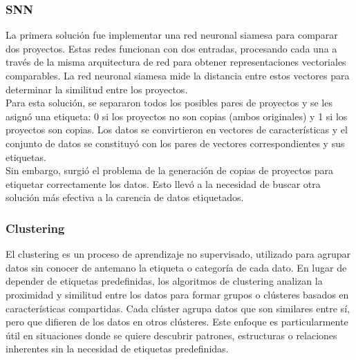 \subsubsection{SNN}
La primera solución fue implementar una red neuronal siamesa para comparar dos proyectos. Estas redes funcionan con dos entradas, procesando cada una a través de la misma arquitectura de red para obtener representaciones vectoriales comparables. La red neuronal siamesa mide la distancia entre estos vectores para determinar la similitud entre los proyectos.\\

Para esta solución, se separaron todos los posibles pares de proyectos y se les asignó una etiqueta: 0 si los proyectos no son copias (ambos originales) y 1 si los proyectos son copias. Los datos se convirtieron en vectores de características y el conjunto de datos se constituyó con los pares de vectores correspondientes y sus etiquetas.\\

Sin embargo, surgió el problema de la generación de copias de proyectos para etiquetar correctamente los datos. Esto llevó a la necesidad de buscar otra solución más efectiva a la carencia de datos etiquetados.


\subsubsection{Clustering}

El clustering es un proceso de aprendizaje no supervisado, utilizado para agrupar datos sin conocer de antemano la etiqueta o categoría de cada dato. En lugar de depender de etiquetas predefinidas, los algoritmos de clustering analizan la proximidad y similitud entre los datos para formar grupos o clústeres basados en características compartidas. Cada clúster agrupa datos que son similares entre sí, pero que difieren de los datos en otros clústeres. Este enfoque es particularmente útil en situaciones donde se quiere descubrir patrones, estructuras o relaciones inherentes sin la necesidad de etiquetas predefinidas.\\

